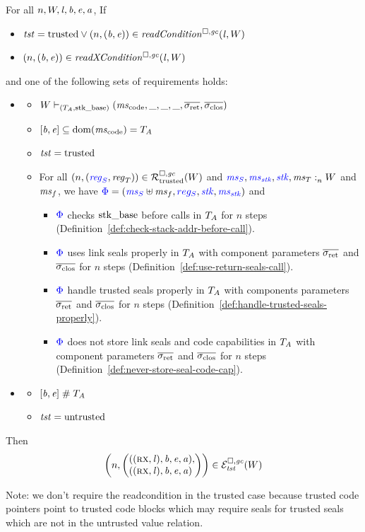 \documentclass[a4paper]{article}
\begin{document}
\begin{theorem}[FTLR]
  \label{thm:ftlr}
  For all $n,W,\mathit{l},\mathit{b},\mathit{e},\mathit{a}$,
  If
  \begin{itemize}
  \item $\trust = \trusted \vee \npair{(\baddr,\eaddr)} \in \readCond{\lin,W}$
  \item $\npair{(\baddr,\eaddr)} \in \xReadCond{\lin,W}$
  \end{itemize}
  and one of the following sets of requirements holds:
  \begin{itemize}
  \item \begin{itemize}
    \item $W \vdash_{(\ta,\stkb)} (\mscode,\_,\_,\_,\sigrets,\sigcloss)$
    \item $[\baddr,\eaddr] \subseteq \dom(\mscode) = \ta$
    \item $\mathit{tst} = \mathrm{trusted}$
    \item For all $\npair{\stpair{\reg}{\reg}} \in \lrrtrusted(W)$ and ${\color{blue} \mathit{ms}_S},{\color{blue} \mathit{ms}_{\mathit{stk}}},{\color{blue} \mathit{stk}},\mathit{ms}_T :_{n}^{}W$ and $\mathit{ms}_f$, we have ${\color{blue} \Phi} = ({\color{blue} \mathit{ms}_S} \uplus \mathit{ms}_f, {\color{blue} reg_S}, {\color{blue} \mathit{stk}}, {\color{blue} \mathit{ms}_{\mathit{stk}}})$ and 
      \begin{itemize}           
      \item ${\color{blue} \Phi}$ checks $\mathrm{stk\_base}$ before calls in $T_{A}$ for $n$ steps (Definition~\ref{def:check-stack-addr-before-call}).
      \item ${\color{blue} \Phi}$ uses link seals properly in $T_{A}$ with component parameters $\sigrets$ and $\sigcloss$ for $n$ steps (Definition~\ref{def:use-return-seals-call}).
      \item ${\color{blue} \Phi}$ handle trusted seals properly in $T_{A}$ with components parameters $\sigrets$ and $\sigcloss$ for $n$ steps (Definition~\ref{def:handle-trusted-seals-properly}).
      \item ${\color{blue} \Phi}$ does not store link seals and code capabilities in $T_{A}$ with component parameters $\sigrets$ and $\sigcloss$ for $n$ steps (Definition~\ref{def:never-store-seal-code-cap}).
      \end{itemize}
    \end{itemize}
  \item
    \begin{itemize}
    \item $[\mathit{b},\mathit{e}] \mathrel{\#} T_{A}$
    \item $\mathit{tst} = \mathrm{untrusted}$
    \end{itemize}
  \end{itemize}
  Then
  \[
    \npair{\left(\arraycolsep=0pt\array{l}((\rx,\lin),\baddr,\eaddr,\aaddr),\\
      ((\rx,\lin),\baddr,\eaddr,\aaddr)\endarray\right)} \in \lreg{\trust}(W)
  \]
\end{theorem}
Note: we don't require the readcondition in the trusted case because trusted code pointers point to trusted code blocks which may require seals for trusted seals which are not in the untrusted value relation.
\end{document}
